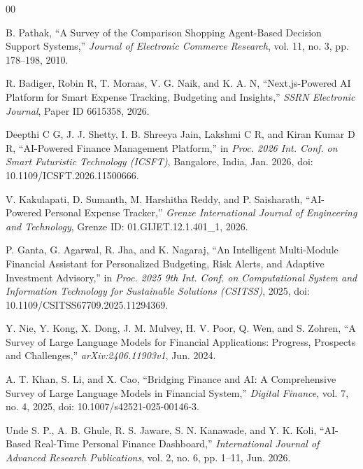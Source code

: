 \documentclass[conference]{IEEEtran}
\begin{document}
\begin{thebibliography}{00}

B. Pathak, ``A Survey of the Comparison Shopping Agent-Based Decision Support Systems,'' \emph{Journal of Electronic Commerce Research}, vol. 11, no. 3, pp. 178--198, 2010.

R. Badiger, Robin R, T. Moraas, V. G. Naik, and K. A. N, ``Next.js-Powered AI Platform for Smart Expense Tracking, Budgeting and Insights,'' \emph{SSRN Electronic Journal}, Paper ID 6615358, 2026.

Deepthi C G, J. J. Shetty, I. B. Shreeya Jain, Lakshmi C R, and Kiran Kumar D R, ``AI-Powered Finance Management Platform,'' in \emph{Proc. 2026 Int. Conf. on Smart Futuristic Technology (ICSFT)}, Bangalore, India, Jan. 2026, doi: 10.1109/ICSFT.2026.11500666.

V. Kakulapati, D. Sumanth, M. Harshitha Reddy, and P. Saisharath, ``AI-Powered Personal Expense Tracker,'' \emph{Grenze International Journal of Engineering and Technology}, Grenze ID: 01.GIJET.12.1.401\_1, 2026.

P. Ganta, G. Agarwal, R. Jha, and K. Nagaraj, ``An Intelligent Multi-Module Financial Assistant for Personalized Budgeting, Risk Alerts, and Adaptive Investment Advisory,'' in \emph{Proc. 2025 9th Int. Conf. on Computational System and Information Technology for Sustainable Solutions (CSITSS)}, 2025, doi: 10.1109/CSITSS67709.2025.11294369.

Y. Nie, Y. Kong, X. Dong, J. M. Mulvey, H. V. Poor, Q. Wen, and S. Zohren, ``A Survey of Large Language Models for Financial Applications: Progress, Prospects and Challenges,'' \emph{arXiv:2406.11903v1}, Jun. 2024.

A. T. Khan, S. Li, and X. Cao, ``Bridging Finance and AI: A Comprehensive Survey of Large Language Models in Financial System,'' \emph{Digital Finance}, vol. 7, no. 4, 2025, doi: 10.1007/s42521-025-00146-3.

Unde S. P., A. B. Ghule, R. S. Jaware, S. N. Kanawade, and Y. K. Koli, ``AI-Based Real-Time Personal Finance Dashboard,'' \emph{International Journal of Advanced Research Publications}, vol. 2, no. 6, pp. 1--11, Jun. 2026.


\end{thebibliography}
\end{document}
